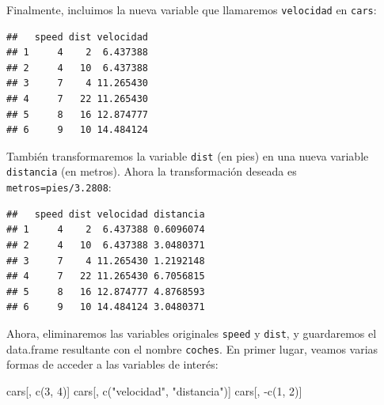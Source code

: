 \documentclass[
]{book}
\newenvironment{Shaded}{\begin{snugshade}}{\end{snugshade}}
\newcommand{\DecValTok}[1]{\textcolor[rgb]{0.00,0.00,0.81}{#1}}
\newcommand{\FloatTok}[1]{\textcolor[rgb]{0.00,0.00,0.81}{#1}}
\newcommand{\FunctionTok}[1]{\textcolor[rgb]{0.00,0.00,0.00}{#1}}
\newcommand{\NormalTok}[1]{#1}
\newcommand{\OtherTok}[1]{\textcolor[rgb]{0.56,0.35,0.01}{#1}}
\newcommand{\SpecialCharTok}[1]{\textcolor[rgb]{0.00,0.00,0.00}{#1}}
\newcommand{\StringTok}[1]{\textcolor[rgb]{0.31,0.60,0.02}{#1}}
\theoremstyle{break}
\theoremstyle{nonumberplain}
\begin{document}
Finalmente, incluimos la nueva variable que llamaremos
\texttt{velocidad} en \texttt{cars}:

\begin{Shaded}
\end{Shaded}

\begin{verbatim}
##   speed dist velocidad
## 1     4    2  6.437388
## 2     4   10  6.437388
## 3     7    4 11.265430
## 4     7   22 11.265430
## 5     8   16 12.874777
## 6     9   10 14.484124
\end{verbatim}

También transformaremos la variable \texttt{dist} (en pies) en una nueva
variable \texttt{distancia} (en metros). Ahora la transformación deseada es
\texttt{metros=pies/3.2808}:

\begin{Shaded}
\end{Shaded}

\begin{verbatim}
##   speed dist velocidad distancia
## 1     4    2  6.437388 0.6096074
## 2     4   10  6.437388 3.0480371
## 3     7    4 11.265430 1.2192148
## 4     7   22 11.265430 6.7056815
## 5     8   16 12.874777 4.8768593
## 6     9   10 14.484124 3.0480371
\end{verbatim}

Ahora, eliminaremos las variables originales \texttt{speed} y
\texttt{dist}, y guardaremos el data.frame resultante con el nombre \texttt{coches}.
En primer lugar, veamos varias formas de acceder a las variables de
interés:

\begin{Shaded}
\begin{Highlighting}[]
\NormalTok{cars[, }\FunctionTok{c}\NormalTok{(}\DecValTok{3}\NormalTok{, }\DecValTok{4}\NormalTok{)]}
\NormalTok{cars[, }\FunctionTok{c}\NormalTok{(}\StringTok{"velocidad"}\NormalTok{, }\StringTok{"distancia"}\NormalTok{)]}
\NormalTok{cars[, }\SpecialCharTok{{-}}\FunctionTok{c}\NormalTok{(}\DecValTok{1}\NormalTok{, }\DecValTok{2}\NormalTok{)]}
\end{Highlighting}
\end{Shaded}
\end{document}
